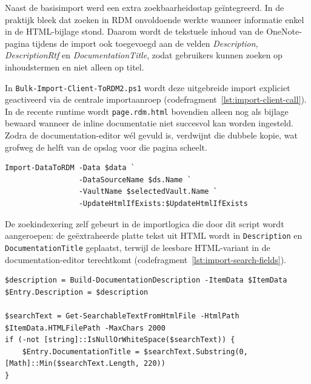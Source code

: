 Naast de basisimport werd een extra zoekbaarheidsstap geïntegreerd. In de praktijk bleek dat zoeken in RDM onvoldoende werkte wanneer informatie enkel in de HTML-bijlage stond. Daarom wordt de tekstuele inhoud van de OneNote-pagina tijdens de import ook toegevoegd aan de velden \emph{Description}, \emph{DescriptionRtf} en \emph{DocumentationTitle}, zodat gebruikers kunnen zoeken op inhoudstermen en niet alleen op titel.

In \texttt{Bulk-Import-Client-ToRDM2.ps1} wordt deze uitgebreide import expliciet geactiveerd via de centrale importaanroep (codefragment~\ref{lst:import-client-call}). In de recente runtime wordt \texttt{page.rdm.html} bovendien alleen nog als bijlage bewaard wanneer de inline documentatie niet succesvol kan worden ingesteld. Zodra de documentation-editor wél gevuld is, verdwijnt die dubbele kopie, wat grofweg de helft van de opslag voor die pagina scheelt.

\begin{listing}[htbp]
\begin{lstlisting}
Import-DataToRDM -Data $data `
                 -DataSourceName $ds.Name `
                 -VaultName $selectedVault.Name `
                 -UpdateHtmlIfExists:$UpdateHtmlIfExists
\end{lstlisting}
\caption{Importaanroep in Bulk-Import-Client-ToRDM2.ps1}
\label{lst:import-client-call}
\end{listing}

De zoekindexering zelf gebeurt in de importlogica die door dit script wordt aangeroepen: de geëxtraheerde platte tekst uit HTML wordt in \texttt{Description} en \texttt{DocumentationTitle} geplaatst, terwijl de leesbare HTML-variant in de documentation-editor terechtkomt (codefragment~\ref{lst:import-search-fields}).

\begin{listing}[htbp]
\begin{lstlisting}
$description = Build-DocumentationDescription -ItemData $ItemData
$Entry.Description = $description

$searchText = Get-SearchableTextFromHtmlFile -HtmlPath $ItemData.HTMLFilePath -MaxChars 2000
if (-not [string]::IsNullOrWhiteSpace($searchText)) {
    $Entry.DocumentationTitle = $searchText.Substring(0, [Math]::Min($searchText.Length, 220))
}
\end{lstlisting}
\caption{Toevoegen van inhoudstekst aan Description, DescriptionRtf en DocumentationTitle}
\label{lst:import-search-fields}
\end{listing}

